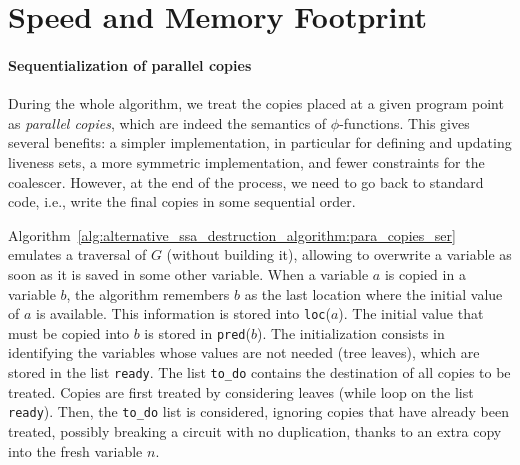 \section{Speed and Memory Footprint}
\paragraph{Sequentialization of parallel copies}

                    
During the whole algorithm, we treat the copies placed at a given program point
as \emph{parallel copies}, which are indeed the semantics of $\phi$-functions.
This gives several benefits: a simpler implementation, in particular for
defining and updating liveness sets, a more symmetric implementation,
and fewer constraints for the coalescer. However, at the end of the process, we
need to go back to standard code, i.e., write the final copies in some
sequential order.

Algorithm~\ref{alg:alternative_ssa_destruction_algorithm:para_copies_ser} emulates a traversal of $G$ (without
building it), allowing to overwrite a variable as soon as it is saved in some
other variable.  When a variable $a$ is copied in a variable $b$, the algorithm
remembers $b$ as the last location where the initial value of $a$ is available.
This information is stored into \texttt{loc}($a$). The initial value that
must be copied into $b$ is stored in \texttt{pred}($b$). The initialization
consists in identifying the variables whose values are not needed (tree
leaves), which are stored in the list \texttt{ready}.  The list
\texttt{to\_do} contains the destination of all copies to be treated.  Copies
are first treated by considering leaves (while loop on the list
\texttt{ready}). Then, the \texttt{to\_do} list is considered, ignoring
copies that have already been treated, possibly breaking a circuit with no
duplication, thanks to an extra copy into the fresh variable $n$.

